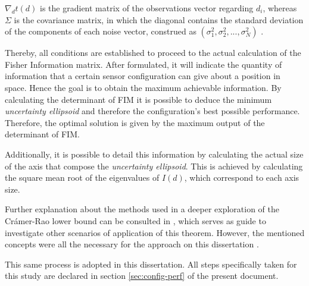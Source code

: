 $\nabla_{d}t(d)$ is the gradient matrix of the observations vector regarding $d_i$, whereas $\Sigma$ is the covariance matrix, in which the diagonal contains the standard deviation of the components of each noise vector, construed as $(\sigma_1^2 , \sigma_2^2 , ... , \sigma_N^2)$ .

Thereby, all conditions are established to proceed to the actual calculation of the Fisher Information matrix. After formulated, it will indicate the quantity of information that a certain sensor configuration can give about a position in space. Hence the goal is to obtain the maximum achievable information. By calculating the determinant of FIM it is possible to deduce the minimum \textit{uncertainty ellipsoid} and therefore the configuration's best possible performance. Therefore, the optimal solution is given by the maximum output of the determinant of FIM.

Additionally, it is possible to detail this information by calculating the actual size of the axis that compose the \textit{uncertainty ellipsoid}. This is achieved by calculating the square mean root of the eigenvalues of $I(d)$, which correspond to each axis size.

Further explanation about the methods used in a deeper exploration of the Crámer-Rao lower bound can be consulted in \cite{bishop-cramer-rao}, which serves as guide to investigate other scenarios of application of this theorem. However, the mentioned concepts were all the necessary for the approach on this dissertation .

This same process is adopted in this dissertation. All steps specifically taken for this study are declared in section \ref{sec:config-perf} of the present document.


